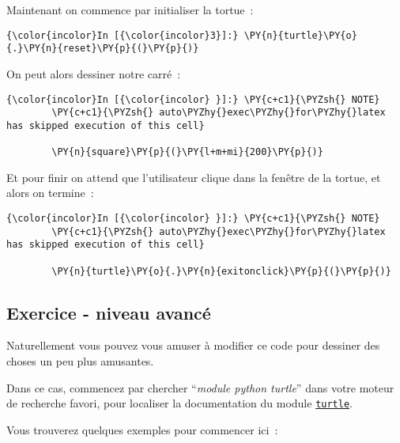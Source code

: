     Maintenant on commence par initialiser la tortue~:

    \begin{Verbatim}[commandchars=\\\{\},frame=single,framerule=0.3mm,rulecolor=\color{cellframecolor}]
{\color{incolor}In [{\color{incolor}3}]:} \PY{n}{turtle}\PY{o}{.}\PY{n}{reset}\PY{p}{(}\PY{p}{)}
\end{Verbatim}


    On peut alors dessiner notre carré~:

    \begin{Verbatim}[commandchars=\\\{\},frame=single,framerule=0.3mm,rulecolor=\color{cellframecolor}]
{\color{incolor}In [{\color{incolor} }]:} \PY{c+c1}{\PYZsh{} NOTE}
        \PY{c+c1}{\PYZsh{} auto\PYZhy{}exec\PYZhy{}for\PYZhy{}latex has skipped execution of this cell}
        
        \PY{n}{square}\PY{p}{(}\PY{l+m+mi}{200}\PY{p}{)}
\end{Verbatim}


    Et pour finir on attend que l'utilisateur clique dans la fenêtre de la
tortue, et alors on termine~:

    \begin{Verbatim}[commandchars=\\\{\},frame=single,framerule=0.3mm,rulecolor=\color{cellframecolor}]
{\color{incolor}In [{\color{incolor} }]:} \PY{c+c1}{\PYZsh{} NOTE}
        \PY{c+c1}{\PYZsh{} auto\PYZhy{}exec\PYZhy{}for\PYZhy{}latex has skipped execution of this cell}
        
        \PY{n}{turtle}\PY{o}{.}\PY{n}{exitonclick}\PY{p}{(}\PY{p}{)}
\end{Verbatim}


    \hypertarget{exercice---niveau-avancuxe9}{%
\subsection{Exercice - niveau
avancé}\label{exercice---niveau-avancuxe9}}

    Naturellement vous pouvez vous amuser à modifier ce code pour dessiner
des choses un peu plus amusantes.

Dans ce cas, commencez par chercher ``\emph{module python turtle}'' dans
votre moteur de recherche favori, pour localiser la documentation du
module
\href{https://docs.python.org/3/library/turtle.html}{\texttt{turtle}}.

Vous trouverez quelques exemples pour commencer ici~:


